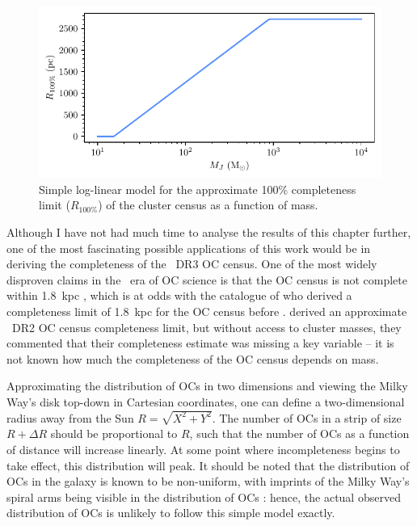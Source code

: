 \begin{figure}[t]
    \centering
    \includegraphics[width=\textwidth]{fig/c4/discussion_completeness_function.pdf}
    \caption[Simple log-linear model for the approximate 100\% completeness limit ($R_{100\%}$) of the cluster census]{Simple log-linear model for the approximate 100\% completeness limit ($R_{100\%}$) of the cluster census as a function of mass.}
    \label{fig:dynamics:discussion:completeness_function}
\end{figure}

Although I have not had much time to analyse the results of this chapter further, one of the most fascinating possible applications of this work would be in deriving the completeness of the \gaia\ DR3 OC census. One of the most widely disproven claims in the \gaia\ era of OC science is that the OC census is not complete within 1.8~kpc \citep{cantat-gaudin_milky_2022}, which is at odds with the catalogue of \cite{kharchenko_global_2013} who derived a completeness limit of 1.8~kpc for the OC census before \gaia. \cite{anders_milky_2020} derived an approximate \gaia\ DR2 OC census completeness limit, but without access to cluster masses, they commented that their completeness estimate was missing a key variable -- it is not known how much the completeness of the OC census depends on mass.

Approximating the distribution of OCs in two dimensions and viewing the Milky Way's disk top-down in Cartesian coordinates, one can define a two-dimensional radius away from the Sun $R=\sqrt{X^2+Y^2}$. The number of OCs in a strip of size $R+\Delta R$ should be proportional to $R$, such that the number of OCs as a function of distance will increase linearly. At some point where incompleteness begins to take effect, this distribution will peak. It should be noted that the distribution of OCs in the galaxy is known to be non-uniform, with imprints of the Milky Way's spiral arms being visible in the distribution of OCs \cite{castro-ginard_milky_2021}: hence, the actual observed distribution of OCs is unlikely to follow this simple model exactly.

